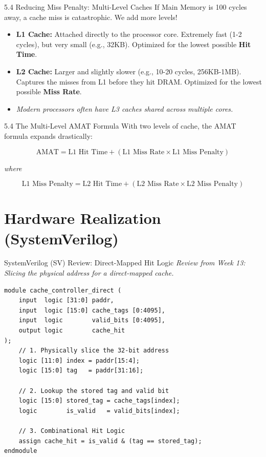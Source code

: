 \documentclass[aspectratio=169]{beamer}
\begin{document}
\begin{frame}{5.4 Reducing Miss Penalty: Multi-Level Caches}
If Main Memory is 100 cycles away, a cache miss is catastrophic. We add more levels!
\begin{itemize}
    \item \textbf{L1 Cache:} Attached directly to the processor core. Extremely fast (1-2 cycles), but very small (e.g., 32KB). Optimized for the lowest possible \textbf{Hit Time}.
    \vspace{0.3cm}
    \item \textbf{L2 Cache:} Larger and slightly slower (e.g., 10-20 cycles, 256KB-1MB). Captures the misses from L1 before they hit DRAM. Optimized for the lowest possible \textbf{Miss Rate}.
    \vspace{0.3cm}
    \item \textit{Modern processors often have L3 caches shared across multiple cores.}
\end{itemize}
\end{frame}

\begin{frame}{5.4 The Multi-Level AMAT Formula}
With two levels of cache, the AMAT formula expands drastically:
\vspace{0.5cm}

\Large
\[ \text{AMAT} = \text{L1 Hit Time} + (\text{L1 Miss Rate} \times \text{L1 Miss Penalty}) \]

\normalsize
\vspace{0.3cm}
\textit{where}
\vspace{0.3cm}

\Large
\[ \text{L1 Miss Penalty} = \text{L2 Hit Time} + (\text{L2 Miss Rate} \times \text{L2 Miss Penalty}) \]
\end{frame}

\section{Hardware Realization (SystemVerilog)}

\begin{frame}[fragile]{SystemVerilog (SV) Review: Direct-Mapped Hit Logic}
\textit{Review from Week 13: Slicing the physical address for a direct-mapped cache.}
{\scriptsize
\begin{verbatim}
module cache_controller_direct (
    input  logic [31:0] paddr,
    input  logic [15:0] cache_tags [0:4095], 
    input  logic        valid_bits [0:4095],
    output logic        cache_hit
);
    // 1. Physically slice the 32-bit address
    logic [11:0] index = paddr[15:4];
    logic [15:0] tag   = paddr[31:16];

    // 2. Lookup the stored tag and valid bit
    logic [15:0] stored_tag = cache_tags[index];
    logic        is_valid   = valid_bits[index];

    // 3. Combinational Hit Logic
    assign cache_hit = is_valid & (tag == stored_tag);
endmodule
\end{verbatim}
}
\end{frame}
\end{document}
